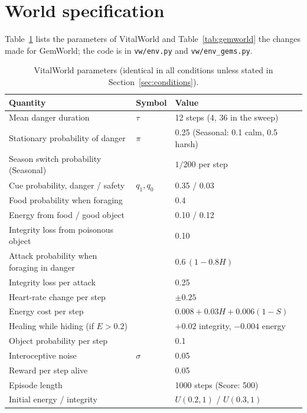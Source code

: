 \documentclass[11pt]{article}
\begin{document}
\appendix
\section{World specification}
\label{app:world}

Table~\ref{tab:world} lists the parameters of VitalWorld and Table~\ref{tab:gemworld} the changes made for GemWorld; the code is in \texttt{vw/env.py} and \texttt{vw/env\_gems.py}.

\begin{table}[h]
\centering\small
\caption{VitalWorld parameters (identical in all conditions unless stated in Section~\ref{sec:conditions}).}
\label{tab:world}
\begin{tabular}{@{}lll@{}}
\toprule
Quantity & Symbol & Value \\
\midrule
Mean danger duration & $\tau$ & 12 steps (4, 36 in the sweep) \\
Stationary probability of danger & $\pi$ & 0.25 (Seasonal: 0.1 calm, 0.5 harsh) \\
Season switch probability (Seasonal) & & $1/200$ per step \\
Cue probability, danger / safety & $q_1, q_0$ & 0.35 / 0.03 \\
Food probability when foraging & & 0.4 \\
Energy from food / good object & & 0.10 / 0.12 \\
Integrity loss from poisonous object & & 0.10 \\
Attack probability when foraging in danger & & $0.6\,(1-0.8H)$ \\
Integrity loss per attack & & 0.25 \\
Heart-rate change per step & & $\pm 0.25$ \\
Energy cost per step & & $0.008 + 0.03H + 0.006(1-S)$ \\
Healing while hiding (if $E>0.2$) & & $+0.02$ integrity, $-0.004$ energy \\
Object probability per step & & 0.1 \\
Interoceptive noise & $\sigma$ & 0.05 \\
Reward per step alive & & 0.05 \\
Episode length & & 1000 steps (Score: 500) \\
Initial energy / integrity & & $U(0.2,1)$ / $U(0.3,1)$ \\
\bottomrule
\end{tabular}
\end{table}
\end{document}
